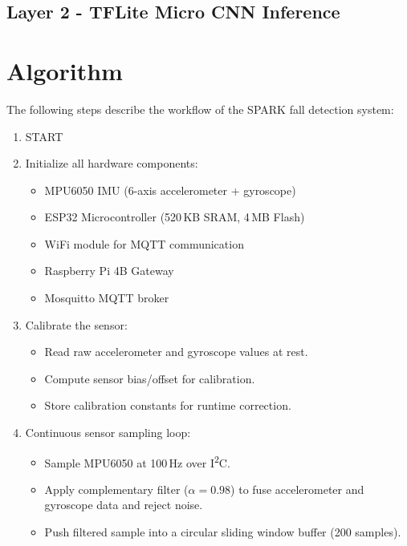 \subsection{Layer 2 - TFLite Micro CNN Inference}



\section{Algorithm}

The following steps describe the workflow of the SPARK fall detection system:

\begin{enumerate}

    \item START

    \item Initialize all hardware components:
    \begin{itemize}
        \item MPU6050 IMU (6-axis accelerometer + gyroscope)
        \item ESP32 Microcontroller (520\,KB SRAM, 4\,MB Flash)
        \item WiFi module for MQTT communication
        \item Raspberry Pi 4B Gateway
        \item Mosquitto MQTT broker
    \end{itemize}

    \item Calibrate the sensor:
    \begin{itemize}
        \item Read raw accelerometer and gyroscope values at rest.
        \item Compute sensor bias/offset for calibration.
        \item Store calibration constants for runtime correction.
    \end{itemize}

    \item Continuous sensor sampling loop:
    \begin{itemize}
        \item Sample MPU6050 at 100\,Hz over I\textsuperscript{2}C.
        \item Apply complementary filter ($\alpha = 0.98$) to fuse accelerometer and gyroscope data and reject noise.
        \item Push filtered sample into a circular sliding window buffer (200 samples).
    \end{itemize}


\end{enumerate}
